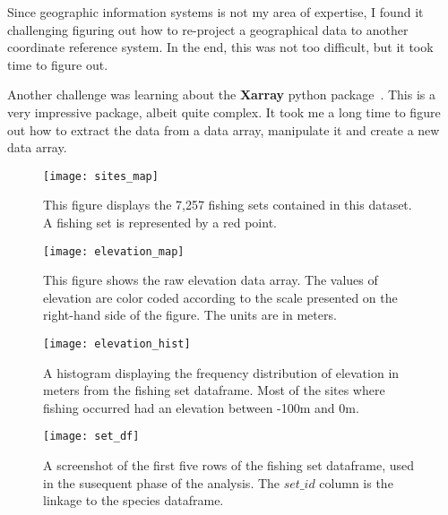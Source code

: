 Since geographic information systems is not my area of expertise, I found it challenging figuring out how to re-project a geographical data to another
coordinate reference system.
In the end, this was not too difficult, but it took time to figure out.

Another challenge was learning about the \textbf{Xarray} python package~\cite{xarray}.
This is a very impressive package, albeit quite complex.
It took me a long time to figure out how to extract the data from a data array, manipulate it and create a new data array.


\begin{figure}
    \texttt{[image: sites\_map]}
    \caption{
        This figure displays the 7,257 fishing sets contained in this dataset.
        A fishing set is represented by a red point.
    }
    \label{fig:set_map}
\end{figure}

\begin{figure}
    \texttt{[image: elevation\_map]}
    \caption{
        This figure shows the raw elevation data array.
        The values of elevation are color coded according to the scale presented on the right-hand side of the figure.
        The units are in meters.
    }
    \label{fig:elevation_map}
\end{figure}

\begin{figure}
    \texttt{[image: elevation\_hist]}
    \caption{
        A histogram displaying the frequency distribution of elevation in meters from the fishing set dataframe.
        Most of the sites where fishing occurred had an elevation between -100m and 0m.
    }
    \label{fig:elevation_hist}
\end{figure}

\begin{figure}
    \texttt{[image: set\_df]}
    \caption{
        A screenshot of the first five rows of the fishing set dataframe, used in the susequent phase of the analysis.
        The $set\_id$ column is the linkage to the species dataframe.
    }
    \label{fig:set_df}
\end{figure}